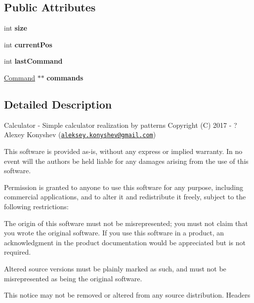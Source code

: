 \subsection*{Public Attributes}
\begin{DoxyCompactItemize}
\item 
\hypertarget{class_command_list_adc77c49a4c604cdd32bd77ad1ee89ff6}{}int {\bfseries size}\label{class_command_list_adc77c49a4c604cdd32bd77ad1ee89ff6}

\item 
\hypertarget{class_command_list_a58ea031961578de2c50b8c0fb6f5ce31}{}int {\bfseries current\+Pos}\label{class_command_list_a58ea031961578de2c50b8c0fb6f5ce31}

\item 
\hypertarget{class_command_list_a076cd854c00450cc01218c168c01af0e}{}int {\bfseries last\+Command}\label{class_command_list_a076cd854c00450cc01218c168c01af0e}

\item 
\hypertarget{class_command_list_ae51735999a6d1f60ed22c70ae68d6482}{}\hyperlink{class_command}{Command} $\ast$$\ast$ {\bfseries commands}\label{class_command_list_ae51735999a6d1f60ed22c70ae68d6482}

\end{DoxyCompactItemize}


\subsection{Detailed Description}
Calculator -\/ Simple calculator realization by patterns Copyright (C) 2017 -\/ ? Alexey Konyshev (\href{mailto:aleksey.konyshev@gmail.com}{\tt aleksey.\+konyshev@gmail.\+com})

This software is provided \textquotesingle{}as-\/is\textquotesingle{}, without any express or implied warranty. In no event will the authors be held liable for any damages arising from the use of this software.

Permission is granted to anyone to use this software for any purpose, including commercial applications, and to alter it and redistribute it freely, subject to the following restrictions\+:


\begin{DoxyEnumerate}
\item The origin of this software must not be misrepresented; you must not claim that you wrote the original software. If you use this software in a product, an acknowledgment in the product documentation would be appreciated but is not required.
\item Altered source versions must be plainly marked as such, and must not be misrepresented as being the original software.
\item This notice may not be removed or altered from any source distribution. Headers 
\end{DoxyEnumerate}

